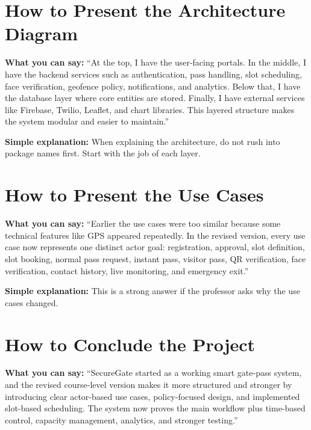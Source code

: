 \documentclass[12pt,letterpaper]{article}
\newcommand{\simple}[1]{\textbf{Simple explanation:} #1}
\newcommand{\say}[1]{\textbf{What you can say:} ``#1''}
\begin{document}
\section{How to Present the Architecture Diagram}

\say{At the top, I have the user-facing portals. In the middle, I have the backend services such as authentication, pass handling, slot scheduling, face verification, geofence policy, notifications, and analytics. Below that, I have the database layer where core entities are stored. Finally, I have external services like Firebase, Twilio, Leaflet, and chart libraries. This layered structure makes the system modular and easier to maintain.}

\simple{When explaining the architecture, do not rush into package names first. Start with the job of each layer.}

\section{How to Present the Use Cases}

\say{Earlier the use cases were too similar because some technical features like GPS appeared repeatedly. In the revised version, every use case now represents one distinct actor goal: registration, approval, slot definition, slot booking, normal pass request, instant pass, visitor pass, QR verification, face verification, contact history, live monitoring, and emergency exit.}

\simple{This is a strong answer if the professor asks why the use cases changed.}

\section{How to Conclude the Project}

\say{SecureGate started as a working smart gate-pass system, and the revised course-level version makes it more structured and stronger by introducing clear actor-based use cases, policy-focused design, and implemented slot-based scheduling. The system now proves the main workflow plus time-based control, capacity management, analytics, and stronger testing.}

\end{document}
